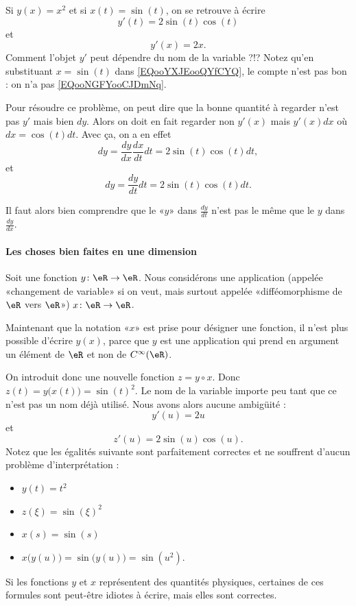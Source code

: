 Si \( y(x)=x^2\) et si \( x(t)=\sin(t)\), on se retrouve à écrire
\begin{equation}        \label{EQooNGFYooCJDmNq}
	y'(t)=2\sin(t)\cos(t)
\end{equation}
et
\begin{equation}        \label{EQooYXJEooQYfCYQ}
	y'(x)=2x.
\end{equation}
Comment l'objet \( y'\) peut dépendre du nom de la variable ?!? Notez qu'en substituant \( x=\sin(t)\) dans \eqref{EQooYXJEooQYfCYQ}, le compte n'est pas bon : on n'a pas \eqref{EQooNGFYooCJDmNq}.

Pour résoudre ce problème, on peut dire que la bonne quantité à regarder n'est pas \( y'\) mais bien \( dy\). Alors on doit en fait regarder non \( y'(x)\) mais \( y'(x)dx\) où \( dx=\cos(t)dt\). Avec ça, on a en effet
\begin{equation}
	dy=\frac{ dy }{ dx }\frac{ dx }{ dt }dt=2\sin(t)\cos(t)dt,
\end{equation}
et
\begin{equation}
	dy=\frac{ dy }{ dt }dt=2\sin(t)\cos(t)dt.
\end{equation}

Il faut alors bien comprendre que le «\( y\)» dans \( \frac{ dy }{ dt }\) n'est pas le même que le \( y\) dans \( \frac{ dy }{ dx }\).

\paragraph{Les choses bien faites en une dimension}

Soit une fonction \( y\colon \eR\to \eR\). Nous considérons une application (appelée «changement de variable» si on veut, mais surtout appelée «difféomorphisme de \( \eR\) vers \( \eR\)») \( x\colon \eR\to \eR\).

Maintenant que la notation «\( x\)» est prise pour désigner une fonction, il n'est plus possible d'écrire \( y(x)\), parce que \( y\) est une application qui prend en argument un élément de \( \eR\) et non de \(  C^{\infty}(\eR)\).

On introduit donc une nouvelle fonction \( z=y\circ x\). Donc \( z(t)=y\big( x(t) \big)=\sin(t)^2\). Le nom de la variable importe peu tant que ce n'est pas un nom déjà utilisé. Nous avons alors aucune ambigüité :
\begin{equation}
	y'(u)=2u
\end{equation}
et
\begin{equation}
	z'(u)=2\sin(u)\cos(u).
\end{equation}
Notez que les égalités suivante sont parfaitement correctes et ne souffrent d'aucun problème d'interprétation :
\begin{itemize}
	\item
	      \( y(t)=t^2\)
	\item
	      \( z(\xi)=\sin(\xi)^2\)
	\item
	      \( x(s)=\sin(s)\)
	\item
	      \( x\big( y(u) \big)=\sin\big( y(u) \big)=\sin(u^2)\).
\end{itemize}
Si les fonctions \( y\) et \( x\) représentent des quantités physiques, certaines de ces formules sont peut-être idiotes à écrire, mais elles sont correctes.

